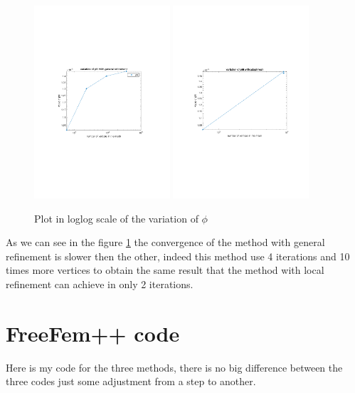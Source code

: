 \documentclass[]{report}
\begin{document}
\begin{figure}
	\begin{center}
		\includegraphics[width=0.45\textwidth]{plotphi_genref.pdf}
		\includegraphics[width=0.45\textwidth]{plotphi_adapt.pdf}
	\end{center}
\caption{Plot in loglog scale of the variation of $\phi$}
\label{phi_comp}
\end{figure}
As we can see in the figure \ref{phi_comp} the convergence of the method with general refinement is slower then the other, indeed this method use 4 iterations and 10 times more vertices to obtain the same result that the method with local refinement can achieve in only 2 iterations.


\newpage
\appendix
\section{FreeFem++ code}
Here is my code for the three methods, there is no big difference between the three codes just some adjustment from a step to another.
\end{document}
